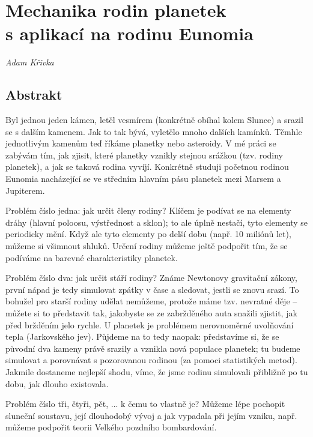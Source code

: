 \documentclass[a4paper, 12pt]{article}
\begin{document}
\section*{Mechanika rodin planetek\\s aplikací na rodinu Eunomia}
\textit{Adam Křivka}
\subsection*{Abstrakt}
Byl jednou jeden kámen, letěl vesmírem (konkrétně obíhal kolem Slunce) a srazil se s dalším kamenem. Jak to tak bývá, vyletělo mnoho dalších kamínků. Těmhle jednotlivým kamenům teď říkáme planetky nebo asteroidy. V mé práci se zabývám tím, jak zjisit, které planetky vznikly stejnou srážkou (tzv. rodiny planetek), a jak se taková rodina vyvíjí. Konkrétně studuji početnou rodinou Eunomia nacházející se ve středním hlavním pásu planetek mezi Marsem a Jupiterem.

Problém číslo jedna: jak určit členy rodiny? Klíčem je podívat se na elementy dráhy (hlavní poloosu, výstřednost a sklon); to ale úplně nestačí, tyto elementy se periodicky mění. Když ale tyto elementy  po delší dobu (např. 10 miliónů let), můžeme si všimnout shluků. Určení rodiny můžeme ještě podpořit tím, že se podíváme na barevné charakteristiky planetek.

Problém číslo dva: jak určit stáří rodiny? Známe Newtonovy gravitační zákony, první nápad je tedy simulovat zpátky v čase a sledovat, jestli se znovu srazí. To bohužel pro starší rodiny udělat nemůžeme, protože máme tzv. nevratné děje -- můžete si to představit tak, jakobyste se ze zabržděného auta snažili zjistit, jak před bržděním jelo rychle. U planetek je problémem nerovnoměrné uvolňování tepla (Jarkovského jev). Půjdeme na to tedy naopak: představíme si, že se původní dva kameny právě srazily a vznikla nová populace planetek; tu budeme simulovat a porovnávat s pozorovanou rodinou (za pomoci statistikých metod). Jakmile dostaneme nejlepší shodu, víme, že jsme rodinu simulovali přibližně po tu dobu, jak dlouho existovala.

Problém číslo tři, čtyři, pět, ... k čemu to vlastně je? Můžeme lépe pochopit sluneční soustavu, její dlouhodobý vývoj a jak vypadala při jejím vzniku, např. můžeme podpořit teorii Velkého pozdního bombardování.
\end{document}
